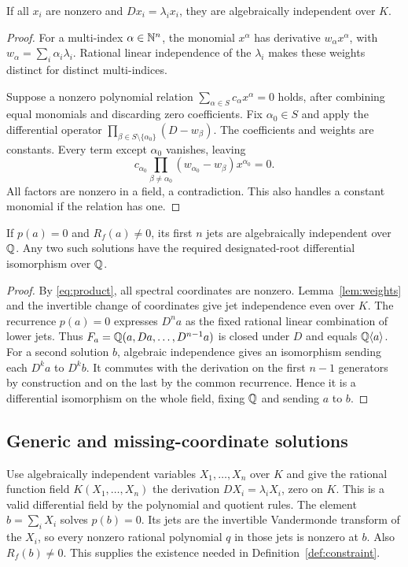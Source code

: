 \documentclass[11pt]{article}
\begin{document}
\begin{lemma}\label{lem:weights}
If all $x_i$ are nonzero and $Dx_i=\lambda_ix_i$, they are
algebraically independent over $K$.
\end{lemma}
\begin{proof}
For a multi-index $\alpha\in\mathbb N^n$, the monomial $x^\alpha$ has
derivative $w_\alpha x^\alpha$, with
$w_\alpha=\sum_i\alpha_i\lambda_i$. Rational linear independence
of the $\lambda_i$ makes these weights distinct for distinct
multi-indices.

Suppose a nonzero polynomial relation
$\sum_{\alpha\in S}c_\alpha x^\alpha=0$ holds, after combining
equal monomials and discarding zero coefficients. Fix $\alpha_0\in S$
and apply the differential operator
$\prod_{\beta\in S\setminus\{\alpha_0\}}(D-w_\beta)$.
The coefficients and weights are constants. Every term except
$\alpha_0$ vanishes, leaving
\[
 c_{\alpha_0}\prod_{\beta\ne\alpha_0}
 (w_{\alpha_0}-w_\beta)x^{\alpha_0}=0.
\]
All factors are nonzero in a field, a contradiction. This also
handles a constant monomial if the relation has one.
\end{proof}

\begin{lemma}\label{lem:genericjets}
If $p(a)=0$ and $R_f(a)\ne0$, its first $n$ jets are algebraically
independent over $\mathbb Q$. Any two such solutions have the required
designated-root differential isomorphism over $\mathbb Q$.
\end{lemma}
\begin{proof}
By \eqref{eq:product}, all spectral coordinates are nonzero.
Lemma~\ref{lem:weights} and the invertible change of coordinates
give jet independence even over $K$. The recurrence $p(a)=0$
expresses $D^na$ as the fixed rational linear combination of lower
jets. Thus
$F_a=\mathbb Q(a,Da,\ldots,D^{n-1}a)$ is closed under $D$ and equals
$\mathbb Q\langle a\rangle$. For a second solution $b$, algebraic
independence gives an isomorphism sending each $D^ka$ to $D^kb$.
It commutes with the derivation on the first $n-1$ generators by
construction and on the last by the common recurrence. Hence it
is a differential isomorphism on the whole field, fixing $\mathbb Q$
and sending $a$ to $b$.
\end{proof}

\subsection{Generic and missing-coordinate solutions}

Use algebraically independent variables $X_1,\ldots,X_n$ over $K$
and give the rational function field $K(X_1,\ldots,X_n)$ the
derivation $DX_i=\lambda_iX_i$, zero on $K$. This is a valid
differential field by the polynomial and quotient rules. The element
$b=\sum_iX_i$ solves $p(b)=0$. Its jets are the invertible Vandermonde
transform of the $X_i$, so every nonzero rational polynomial $q$
in those jets is nonzero at $b$. Also $R_f(b)\ne0$. This supplies
the existence needed in Definition~\ref{def:constraint}.
\end{document}
